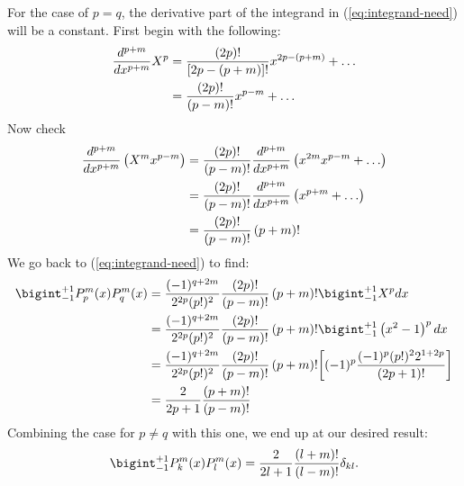 \begin{enumerate}
        For the case of $p = q$, the derivative part of the integrand in (\ref{eq:integrand-need}) will be a constant. First begin with the following:
        \begin{align}
            \frac{d^{p+m}}{dx^{p+m}}X^p&=\frac{(2p)!}{\left[2p-(p+m)\right]!} x^{2p-(p+m)}+\ldots\notag\\
            &=\frac{(2p)!}{\left(p-m\right)!} x^{p-m}+\ldots
        \end{align}
        Now check
        \begin{align}
            \frac{d^{p+m}}{dx^{p+m}}\left(X^mx^{p-m}\right)&=\frac{(2p)!}{\left(p-m\right)!}\frac{d^{p+m}}{dx^{p+m}}\left(x^{2m}x^{p-m}+\ldots\right)\notag\\
            &=\frac{(2p)!}{\left(p-m\right)!}\frac{d^{p+m}}{dx^{p+m}}\left(x^{p+m}+\ldots\right)\notag\\
            &=\frac{(2p)!}{\left(p-m\right)!}\left(p+m\right)!
        \end{align}
        We go back to (\ref{eq:integrand-need}) to find:
        \begin{align}
            \bigint_{-1}^{+1}P_p^m(x)P_q^m(x)&=\frac{(-1)^{q+2m}}{2^{2p}(p!)^2}\frac{(2p)!}{\left(p-m\right)!}\left(p+m\right)!\bigint_{-1}^{+1}X^pdx\notag\\
            &=\frac{(-1)^{q+2m}}{2^{2p}(p!)^2}\frac{(2p)!}{\left(p-m\right)!}\left(p+m\right)!\bigint_{-1}^{+1}\left(x^2-1\right)^pdx\notag\\
            &=\frac{(-1)^{q+2m}}{2^{2p}(p!)^2}\frac{(2p)!}{\left(p-m\right)!}\left(p+m\right)!\bigg[(-1)^p\frac{(-1)^p(p!)^2 2^{1+2p}}{(2p+1)!}\bigg]\notag\\
            &=\frac{2}{2p+1}\frac{\left(p+m\right)!}{\left(p-m\right)!}
        \end{align}
        Combining the case for $p\ne q$ with this one, we end up at our desired result:
        \begin{align}
            \bigint_{-1}^{+1}P_k^m(x)P_l^m(x)=\frac{2}{2l+1}\frac{\left(l+m\right)!}{\left(l-m\right)!}\delta_{kl}.\notag
        \end{align}
        \bigskip\bigskip\hline\hline\bigskip
\end{enumerate}


